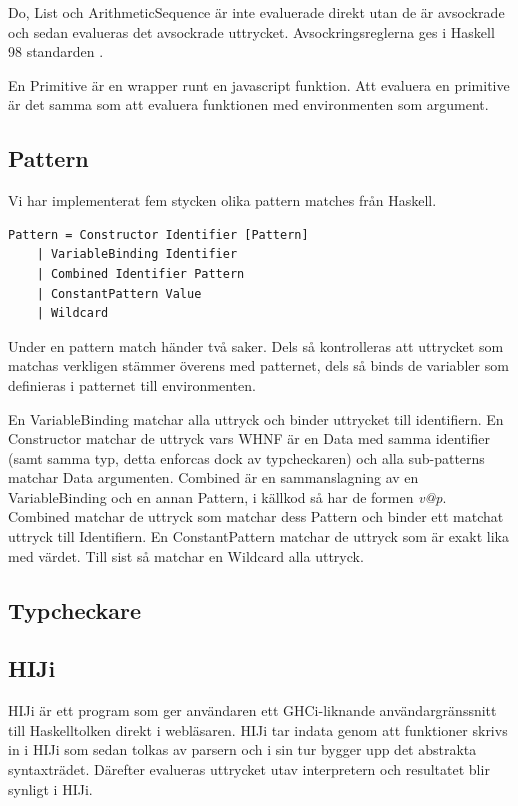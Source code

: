 Do, List och ArithmeticSequence är inte evaluerade direkt utan de är avsockrade och sedan evalueras det avsockrade uttrycket. Avsockringsreglerna ges i Haskell 98 standarden \citep{haskell98chap3}.

En Primitive är en wrapper runt en javascript funktion. Att evaluera en primitive är det samma som att evaluera funktionen med environmenten som argument.

\subsection{Pattern}
Vi har implementerat fem stycken olika pattern matches från Haskell.
\begin{lstlisting}
Pattern = Constructor Identifier [Pattern]
    | VariableBinding Identifier
    | Combined Identifier Pattern
    | ConstantPattern Value
    | Wildcard
\end{lstlisting}
Under en pattern match händer två saker. Dels så kontrolleras att uttrycket som matchas verkligen stämmer överens med patternet, dels så binds de variabler som definieras i patternet till environmenten. 

En VariableBinding matchar alla uttryck och binder uttrycket till identifiern. En Constructor matchar de uttryck vars WHNF är en Data med samma identifier (samt samma typ, detta enforcas dock av typcheckaren) och alla sub-patterns matchar Data argumenten. Combined är en sammanslagning av en VariableBinding och en annan Pattern, i källkod så har de formen \emph{v@p}. Combined matchar de uttryck som matchar dess Pattern och binder ett matchat uttryck till Identifiern. En ConstantPattern matchar de uttryck som är exakt lika med värdet. Till sist så matchar en Wildcard alla uttryck.


\subsection{Typcheckare} 

\subsection{HIJi}

HIJi är ett program som ger användaren ett GHCi-liknande användargränssnitt till Haskelltolken direkt i webläsaren. 
HIJi tar indata genom att funktioner skrivs in i HIJi som sedan tolkas av parsern och i sin tur bygger upp det abstrakta syntaxträdet. Därefter evalueras uttrycket utav interpretern och resultatet blir synligt i HIJi.

